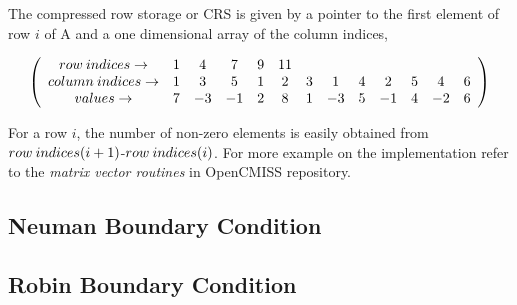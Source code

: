 The compressed row storage or CRS is given by a pointer to the first element of row $i$ of A and a one dimensional array of the column indices,

\[ \left( \begin{array}{cccccccccccccc}
 row \hspace{0.8mm} indices \rightarrow & 1 & 4 & 7 & 9 & 11&   &  &   &   &   &   &  \\
 column \hspace{0.8mm} indices \rightarrow & 1 & 3 & 5 & 1 & 2 & 3 & 1& 4 & 2 & 5 & 4 & 6 \\
 values \rightarrow & 7 &-3 &-1 & 2 & 8 & 1 & -3 & 5 & -1 & 4 & -2& 6 \end{array} \right)\]
 
 
For a row $i$, the number of non-zero elements is easily obtained from $row \hspace{0.8mm} indices(i+1)$-$row \hspace{0.8mm} indices(i)$. For more example on the implementation
 refer to the \textit{matrix vector routines} in OpenCMISS repository.

\subsection{Neuman Boundary Condition}

\subsection{Robin Boundary Condition}
